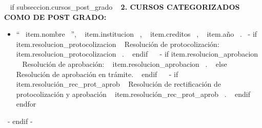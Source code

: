     ~{ if subseccion.cursos_post_grado }~
      \textbf{2. CURSOS CATEGORIZADOS COMO DE POST GRADO:}
      \begin{itemize}
      ~{ for item in subseccion.cursos_post_grado }~
        \item ``~{{ item.nombre }}~'', ~{{ item.institucion }}~, ~{{ item.creditos }}~, ~{{ item.año }}~.
              ~{- if item.resolucion_protocolizacion }~ Resolución de protocolización: ~{{ item.resolucion_protocolizacion }}~. ~{ endif }~
              ~{- if item.resolucion_aprobacion }~ Resolución de aprobación: ~{{ item.resolucion_aprobacion }}~. ~{ else }~ Resolución de aprobación en trámite. ~{ endif }~
              ~{- if item.resolución_rec_prot_aprob }~ Resolución de rectificación de protocolización y aprobación ~{{ item.resolución_rec_prot_aprob }}~. ~{ endif }~
        \vspace{1mm}
      ~{ endfor }~
      \end{itemize}
      \vspace{1mm}
    ~{- endif -}~

